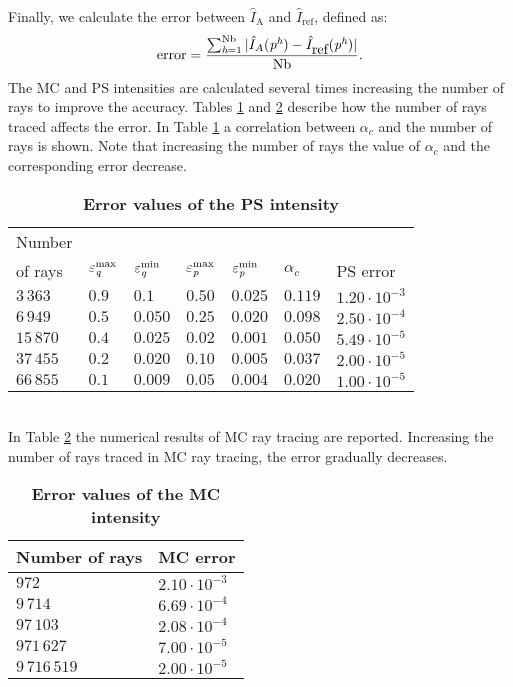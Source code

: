 Finally, we calculate the error between $\hat{I}_{\textrm{A}}$ and $\hat{I}_{\textrm{ref}}$, defined as:
\begin{equation}\label{eq:error}
\mbox{error} = \frac{\sum_{\textit{h}= 1}^{\textrm{Nb}}| \hat{I}_{A}(\textit{p}^{\textit{h}}) - \hat{I}_{\mbox{ref}}(\textit{p}^{\textit{h}})|}{\textrm{Nb}}.
\end{equation}
The MC and PS intensities are calculated several times increasing the number of rays to improve the accuracy.
Tables \ref{tab:table} and \ref{tab:table2} describe how the number of rays traced affects the error. 
In Table \ref{tab:table} a correlation between $\alpha_c$ and the number of rays is shown.
Note that increasing the number of rays the value of $\alpha_c$ and the corresponding error decrease. 
\begin{table}[htbp] \label{tab:table}
\centering
\caption{\bf Error values of the PS intensity}
\begin{tabular}{lllllll}

 \hline  Number \\ of rays\;  & $\varepsilon^{\textrm{max}}_{\textit{q}} $  & $\varepsilon^{\textrm{min}}_{\textit{q}} $   \;     & $\varepsilon^{\textrm{max}}_{\textit{p}}$\;
  & $\varepsilon^{\textrm{min}}_{\textit{p}}$\; & $\alpha_c$  & PS error \\
  \hline 
 $3\,363$ & $0.9$  & $0.1$  & $0.50$  & $0.025$ & $0.119$ & $1.20\cdot10^{-3}$ \\
$6\,949$  & $0.5$  & $0.050$  & $0.25$  & $0.020$ & $0.098$ & $2.50\cdot 10^{-4}$  \\
$15\,870$  & $0.4$  & $0.025$  & $0.02$  & $0.001$ & $0.050$ & $5.49\cdot 10^{-5}$ \\
 $37\,455$  & $0.2$  & $0.020$  & $0.10$ & $0.005$ & $0.037$ & $2.00\cdot 10^{-5}$ \\
 $66\,855$ & $0.1$  & $0.009$  & $0.05$  & $0.004$ & $0.020$ & $1.00\cdot 10^{-5}$ \\
 \hline
 \end{tabular}
 \label{tab:table}
 \end{table}
\\ \indent In Table \ref{tab:table2} the numerical results of MC ray tracing are reported.
Increasing the number of rays traced in MC ray tracing, the error gradually decreases.
\begin{table}[htbp]
\centering
\caption{\bf Error values of the MC intensity}
\begin{tabular}{ll} \hline   Number of rays\; & MC error\\ \hline $972$  & $2.10\cdot10^{-3}$ \\
$9\,714$  & $6.69\cdot 10^{-4}$  \\ $97\,103$  & $2.08\cdot 10^{-4}$ \\ $971\,627$  & $7.00\cdot 10^{-5}$ \\ $9\,716\,519$  & $2.00\cdot 10^{-5}$ \\
 \hline
 \end{tabular}
 \label{tab:table2}
 \end{table}
